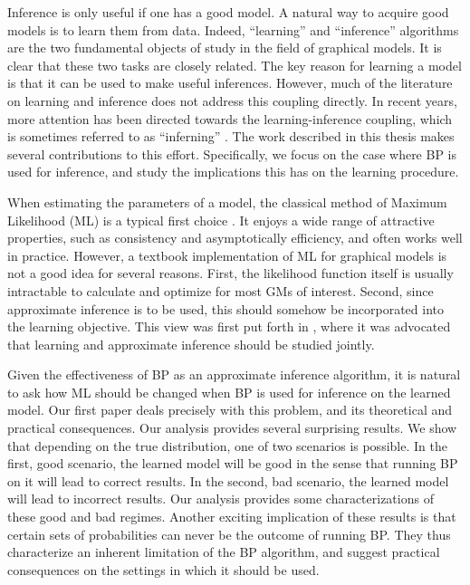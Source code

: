 Inference is only useful if one has a good model.
A natural way to acquire good models is to learn them from data. Indeed, ``learning'' and ``inference'' algorithms are the two fundamental objects of study in the field of graphical models.
It is clear that these two tasks are closely related.
The key reason for learning a model is that it can be used to make useful inferences.
However, much of the literature on learning and inference does not address this coupling directly.
In recent years, more attention has been directed towards the learning-inference coupling, which is sometimes referred to as ``inferning'' \cite{inferning_cite}.
The work described in this thesis makes several contributions to this effort.
Specifically, we focus on the case where BP is used for inference, and study the implications this has on the learning procedure.

When estimating the parameters of a model, the classical method of Maximum Likelihood (ML) is a typical first choice \cite{degroot1986probability}.
It enjoys a wide range of attractive properties, such as consistency and asymptotically efficiency, and often works well in practice. However, a textbook implementation of ML for graphical models is not a good idea for several reasons. First, the likelihood function itself is usually intractable to calculate and optimize for most GMs of interest. Second, since approximate inference is to be used, this should somehow be incorporated into the learning objective. This view was first put forth in  \cite{wainwright2006estimating}, where it was advocated that learning and approximate inference should be studied jointly.  
 
Given the effectiveness of BP as an approximate inference algorithm, it is natural to ask how ML should be changed when BP is used for inference on the learned model.
Our first paper  \cite{heinemann2012cannot} deals precisely with this problem, and its theoretical and practical consequences.
Our analysis provides several surprising results.
We show that depending on the true distribution, one of two scenarios is possible.
In the first, good scenario, the learned model will be good in the sense that running BP on it will lead to correct results.
In the second, bad scenario, the learned model will lead to incorrect results.
Our analysis provides some characterizations of these good and bad regimes. Another exciting implication of these results is that certain sets of probabilities can never be the outcome of running BP. They thus characterize an inherent limitation of the BP algorithm, and suggest practical consequences on the settings in which it should be used.  

